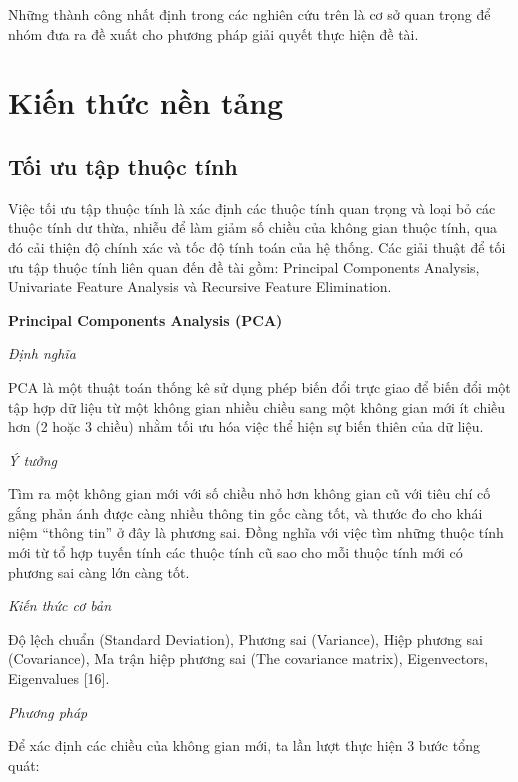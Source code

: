 \documentclass[12pt]{extarticle}
\begin{document}
			\par Những thành công nhất định trong các nghiên cứu trên là cơ sở quan trọng để nhóm đưa ra đề xuất cho phương pháp giải quyết thực hiện đề tài.


\section{Kiến thức nền tảng}
		\subsection{Tối ưu tập thuộc tính}
			\par Việc tối ưu tập thuộc tính là xác định các thuộc tính quan trọng và loại bỏ các thuộc tính dư thừa, nhiễu để làm giảm số chiều của không  gian thuộc tính, qua đó cải thiện độ chính xác và tốc độ tính toán của hệ thống. Các giải thuật để tối ưu tập thuộc tính liên quan đến đề tài gồm: Principal Components Analysis, Univariate Feature Analysis và Recursive Feature Elimination.
			\par \textbf{Principal Components Analysis (PCA)}
				\par \textit{Định nghĩa} 
				\par PCA là một thuật toán thống kê sử dụng phép biến đổi trực giao để biến đổi một tập hợp dữ liệu từ một không gian nhiều chiều sang một không gian mới ít chiều hơn (2 hoặc 3 chiều) nhằm tối ưu hóa việc thể hiện sự biến thiên của dữ liệu. 
				\par  \textit{Ý tưởng}
				\par Tìm ra một không gian mới với số chiều nhỏ hơn không gian cũ với tiêu chí cố gắng phản ánh được càng nhiều thông tin gốc càng tốt, và thước đo cho khái niệm “thông tin” ở đây là phương sai. Đồng nghĩa với việc tìm những thuộc tính mới từ tổ hợp tuyến tính các thuộc tính cũ sao cho mỗi thuộc tính mới có phương sai càng lớn càng tốt. 
				\par  \textit{Kiến thức cơ bản}
				\par Độ lệch chuẩn (Standard Deviation), Phương sai (Variance), Hiệp phương sai (Covariance), Ma trận hiệp phương sai (The covariance matrix), Eigenvectors, Eigenvalues [16]. 
				\par \textit{Phương pháp}
				\par Để xác định các chiều của không gian mới, ta lần lượt thực hiện 3 bước tổng quát:
\end{document}
